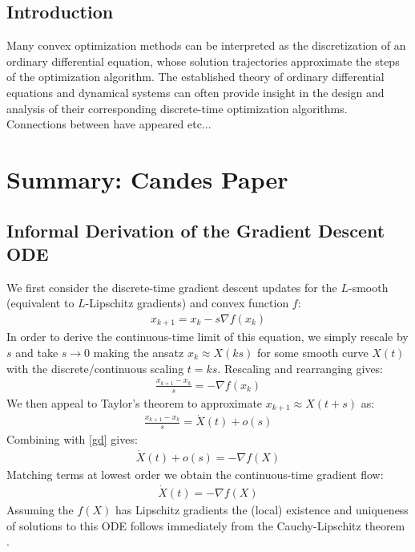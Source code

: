 

\subsection{Introduction}
Many convex optimization methods can be interpreted as the discretization of an ordinary differential equation, whose solution trajectories approximate the steps of the optimization algorithm. The established theory of ordinary differential equations and dynamical systems can often provide insight in the design and analysis of their corresponding discrete-time optimization algorithms. Connections between have appeared etc... 

\section{Summary: Candes Paper}
\subsection{Informal Derivation of the Gradient Descent ODE}
We first consider the discrete-time gradient descent updates for the $L$-smooth (equivalent to $L$-Lipschitz gradients) and convex function $f$:
\begin{align*}
    x_{k+1} = x_k - s \nabla f(x_k) 
\end{align*}
In order to derive the continuous-time limit of this equation, we simply rescale by $s$ and take $s \to 0$ making the ansatz $x_k \approx X(ks)$ for some smooth curve $X(t)$ with the discrete/continuous scaling $t=ks$. Rescaling and rearranging gives:
\begin{align}
    \frac{x_{k+1} - x_k}{s} = - \nabla f(x_k) \label{gd}
\end{align}
We then appeal to Taylor's theorem to approximate $x_{k+1} \approx X(t+s)$ as:
\begin{align*}
    \frac{x_{k+1} - x_k}{s} = \dot{X}(t) + o(s)
\end{align*}
Combining with \eqref{gd} gives:
\begin{align*}
    \dot{X}(t) + o(s) = - \nabla f(X)
\end{align*}
Matching terms at lowest order we obtain the continuous-time gradient flow:
\begin{align}
    \dot{X}(t) = -\nabla f(X) \label{gdode}
\end{align}
Assuming the $f(X)$ has Lipschitz gradients the (local) existence and uniqueness of solutions to this ODE follows immediately from the Cauchy-Lipschitz theorem \cite{teschl2012ordinary}.

